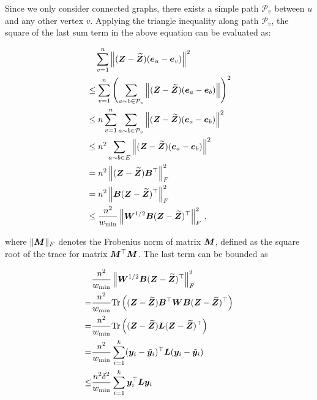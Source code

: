 \documentclass[journal]{IEEEtran}
\begin{document}
\begin{IEEEproof}
    Since we only consider connected graphs,   there exists a simple path \(\mathcal{P}_v\) between \(u\) and any other vertex \(v\).  Applying the triangle inequality along path \(\mathcal{P}_v\), the square of the last sum term in the above equation can be evaluated as:
    \begin{small}
        \begin{align*}
             & \quad \sum_{v=1}^{n} \left\Vert(\boldsymbol{Z}-\widetilde{\boldsymbol{Z}})(\boldsymbol{e}_u-\boldsymbol{e}_v)\right\Vert^2                                             \\
             & \le \sum_{v=1}^{n} \left(\sum_{a\sim b \in \mathcal{P}_v} \left\Vert(\boldsymbol{Z}-\widetilde{\boldsymbol{Z}})(\boldsymbol{e}_a-\boldsymbol{e}_b)\right\Vert\right)^2 \\
             & \le n \sum_{v=1}^{n} \sum_{a\sim b \in \mathcal{P}_v} \left\Vert(\boldsymbol{Z}-\widetilde{\boldsymbol{Z}})(\boldsymbol{e}_a-\boldsymbol{e}_b)\right\Vert^2            \\
             & \le n^2 \sum_{a\sim b \in E} \left\Vert(\boldsymbol{Z}-\widetilde{\boldsymbol{Z}})(\boldsymbol{e}_a-\boldsymbol{e}_b)\right\Vert^2                                     \\
             & = n^2 \left\Vert(\boldsymbol{Z} - \widetilde{\boldsymbol{Z}} ) \boldsymbol{B}^{\top}\right\Vert_{F}^{2}                                                       \\
             & = n^2 \left\Vert\boldsymbol{B}(\boldsymbol{Z} - \widetilde{\boldsymbol{Z}} )^{\top}\right\Vert_{F}^{2}                                                        \\
             & \leq
            \frac{n^2}{w_{\min}} \left\Vert\boldsymbol{W}^{1/2} \boldsymbol{B}(\boldsymbol{Z} - \widetilde{\boldsymbol{Z}} )^{\top}\right\Vert_{F}^{2}\,,
        \end{align*}
    \end{small}
    where \(\| \boldsymbol{M} \|_{F}\) denotes the Frobenius norm of  matrix \(\boldsymbol{M}\),  defined as the square root of the trace for matrix \(\boldsymbol{M}^{\top} \boldsymbol{M}\). The last term can be bounded as
    \begin{small}
        \begin{align*}
                & \frac{n^2}{w_{\min}} \Abs{\matw^{1/2} \matb(\matz - \tilmatz )^{\top}}_{F}^{2}                      \\
            =   & \frac{n^2}{w_{\min}} \trace{(\matz - \tilmatz )\matb^{\top} \matw \matb(\matz - \tilmatz )^{\top}}  \\
            =   & \frac{n^2}{w_{\min}} \trace{(\matz - \tilmatz )\lap(\matz - \tilmatz )^{\top}}                      \\
            =   & \frac{n^2}{w_{\min}} \sum_{i=1}^k (\vecz_i - \tilde{\vecz}_i)^\top \lap (\vecz_i - \tilde{\vecz}_i) \\
            \le & \frac{n^2\delta^2}{w_{\min}} \sum_{i=1}^k \vecz_i^\top\lap\vecz_i                                   \\

\end{align*}
\end{small}
\end{IEEEproof}
\end{document}
